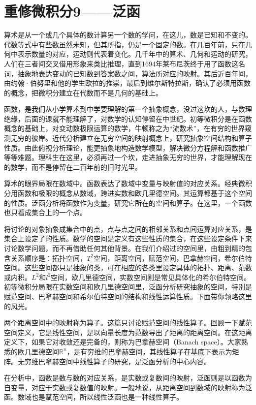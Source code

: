 \chapter{重修微积分9——泛函}

算术是从一个或几个具体的数计算另一个数的学问，在这儿，数是已知和不变的。代数等式中有些数虽然未知，但其所指，仍是一个固定的数。在几百年前，只在几何中表示数量的对应，运动则代表着变化。几千年中的算术、几何和运动的研究，人们在三者间交叉借用形象来类比推理，直到1694年莱布尼茨终于用了函数这名词，抽象地表达变动的已知数到答案数之间，算法所对应的映射。其后近百年间，由约翰·伯努里和他的学生欧拉的推崇，最后到维尔斯特拉斯，确认了必须用函数的概念，把微积分建立在代数而不是几何的基础上。

函数，是我们从小学算术到中学要理解的第一个抽象概念，没过这坎的人，与数理绝缘，后面的课就不能理解了，对数学的认知停留在中世纪。初等微积分是在函数概念的基础上，对变动数极限运算的数学，牛顿称之为“流数术”，在有穷的世界窥测无穷的彼岸。近代分析建立在无穷空间的映射概念上，研究抽象空间结构和算子性质。由此俯视分析理论，能更抽象地构造数学模型，解决微分方程解和函数推广等等难题。理科生在这里，必须再过一个坎，走进抽象无穷的世界，才能理解现在的数学，而不是停留在二百年前的旧时光里。

算术的眼界局限在数域中。函数表达了数域中变量与映射值的对应关系。经典微积分用函数和极限的概念从数域，跨进实数和欧几里德空间。其运算都基于这个空间的性质。泛函分析将函数作为变量，研究它所在的空间和算子。在这里，一个函数也只看成集合上的一个点。

将讨论的对象抽象成集合中的点，点与点之间的相邻关系和点间运算对应关系，是集合上设定了的性质。数学的空间是定义有这些性质的集合，在这些设定条件下来讨论数学问题，而不再借助任何其他背景。在我们介绍过的空间里，由粗到精的包含关系顺序是：拓扑空间，$ T^2 $空间，距离空间，赋范空间，巴拿赫空间，希尔伯特空间。这些空间都只是抽象的类，可在相应的各类里设定具体的拓扑、距离、范数或内积。$ L^2 $和$ l^2 $空间，欧几里德空间，实数空间则是常见具体化的希尔伯特空间。初等微积分局限在实数空间和欧几里德空间里，泛函分析研究抽象的空间，特别是赋范空间、巴拿赫空间和希尔伯特空间的结构和线性运算性质。下面带你领略这里的风光。

两个距离空间中的映射称为算子。这篇只讨论赋范空间的线性算子。回顾一下赋范空间定义，它是线性空间，是以向量长度为范数导出了距离的距离空间。在这距离定义下，如果它对收敛还是完备的，则称为巴拿赫空间（Banach space）。大家熟悉的欧几里德空间$\mathbb{R}^n$，是有穷维的巴拿赫空间，其线性算子在基底下表示为矩阵。无穷维巴拿赫空间中线性算子的研究，是泛函分析的中心内容。

在分析中，函数是数与数的对应关系，是实数或复数间的映射，泛函则是以函数为自变量，对应于实数或复数值的映射。一般地说，从距离空间到数域的映射称为泛函。数域也是赋范空间，所以线性泛函也是一种线性算子。

